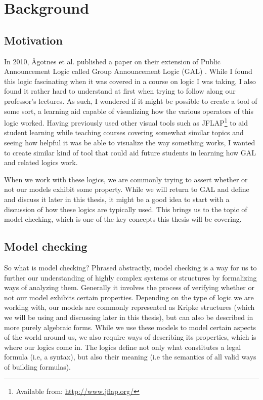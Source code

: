 \section{Background}\label{sec:back}

\subsection{Motivation}

In 2010, Ågotnes et al. published a paper on their extension of Public Announcement Logic called Group Announcement Logic (GAL) \cite{Agotnes2010}. While I found this logic fascinating when it was covered in a course on logic I was taking, I also found it rather hard to understand at first when trying to follow along our professor's lectures. As such, I wondered if it might be possible to create a tool of some sort, a learning aid capable of visualizing how the various operators of this logic worked. Having previously used other visual tools such as JFLAP\footnote{Available from: \url{http://www.jflap.org/}} to aid student learning while teaching courses covering somewhat similar topics and seeing how helpful it was be able to visualize the way something works, I wanted to create similar kind of tool that could aid future students in learning how GAL and related logics work. 

When we work with these logics, we are commonly trying to assert whether or not our models exhibit some property. While we will return to GAL and define and discuss it later in this thesis, it might be a good idea to start with a discussion of how these logics are typically used. This brings us to the topic of model checking, which is one of the key concepts this thesis will be covering.

\subsection{Model checking}

So what is model checking? Phrased abstractly, model checking is a way for us to further our understanding of highly complex systems or structures by formalizing ways of analyzing them. Generally it involves the process of verifying whether or not our model exhibits certain properties. Depending on the type of logic we are working with, our models are commonly represented as Kripke structures (which we will be using and discussing later in this thesis), but can also be described in more purely algebraic forms. While we use these models to model certain aspects of the world around us, we also require ways of describing its properties, which is where our logics come in. The logics define not only what constitutes a legal formula (i.e, a syntax), but also their meaning (i.e the semantics of all valid ways of building formulas). 

